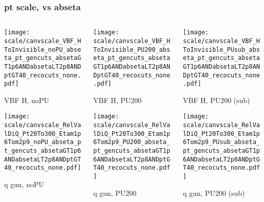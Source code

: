 \documentclass[8pt]{beamer}
\begin{document}
  \begin{frame}
  \frametitle{pt scale, vs abseta}
  
  \begin{columns}
   \begin{column}{0.35\textwidth}
     \texttt{[image: scale/canvscale\_VBF\_HToInvisible\_noPU\_abseta\_pt\_gencuts\_absetaGT1p6ANDabsetaLT2p8ANDptGT40\_recocuts\_none.pdf]}
     
     VBF H, noPU
    
     \texttt{[image: scale/canvscale\_RelValDiQ\_Pt20To300\_Etam1p6Tom2p9\_noPU\_abseta\_pt\_gencuts\_absetaGT1p6ANDabsetaLT2p8ANDptGT40\_recocuts\_none.pdf]}
     
     q gun, noPU
   \end{column}
   \begin{column}{0.35\textwidth}
     \texttt{[image: scale/canvscale\_VBF\_HToInvisible\_PU200\_abseta\_pt\_gencuts\_absetaGT1p6ANDabsetaLT2p8ANDptGT40\_recocuts\_none.pdf]}
     
     VBF H, PU200
    
     \texttt{[image: scale/canvscale\_RelValDiQ\_Pt20To300\_Etam1p6Tom2p9\_PU200\_abseta\_pt\_gencuts\_absetaGT1p6ANDabsetaLT2p8ANDptGT40\_recocuts\_none.pdf]}
     
     q gun, PU200
   \end{column}
   \begin{column}{0.35\textwidth}
     \texttt{[image: scale/canvscale\_VBF\_HToInvisible\_PUsub\_abseta\_pt\_gencuts\_absetaGT1p6ANDabsetaLT2p8ANDptGT40\_recocuts\_none.pdf]}
     
     VBF H, PU200 (sub)
    
     \texttt{[image: scale/canvscale\_RelValDiQ\_Pt20To300\_Etam1p6Tom2p9\_PUsub\_abseta\_pt\_gencuts\_absetaGT1p6ANDabsetaLT2p8ANDptGT40\_recocuts\_none.pdf]}
     
     q gun, PU200 (sub)
   \end{column}
  \end{columns}
 \end{frame}
 
\end{document}
